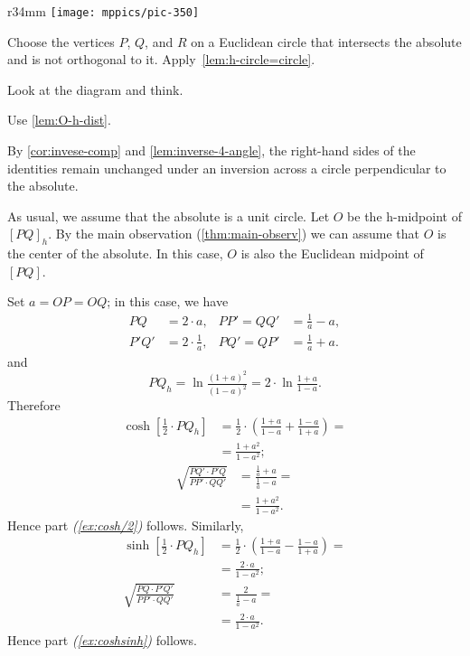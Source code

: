 \begin{wrapfigure}[9]{r}{34mm}
\vskip-0mm
\centering
\texttt{[image: mppics/pic-350]}
\end{wrapfigure}

Choose the vertices $P$, $Q$, and $R$ on a Euclidean circle that intersects the absolute and is not orthogonal to it.
Apply~\ref{lem:h-circle=circle}.

 Look at the diagram and think.

 Use \ref{lem:O-h-dist}.

By \ref{cor:invese-comp} and \ref{lem:inverse-4-angle},
the right-hand sides of the identities 
remain unchanged under an inversion across a circle perpendicular to the absolute.

As usual, we assume that the absolute is a unit circle.
Let $O$ be the h-midpoint of $[PQ]_h$.
By the main observation (\ref{thm:main-observ})
we can assume that $O$ is the center of the absolute.
In this case, $O$ is also the Euclidean midpoint of $[PQ]$.%

Set $a=OP=OQ$; in this case, we have
\begin{align*}
PQ&=2\cdot a,
&
PP'=QQ'&=\tfrac1a-a,
\\
P'Q'&=2\cdot \tfrac1a,
&
PQ'=QP'&=\tfrac1a+a.
\end{align*}
and 
\[PQ_h=\ln \tfrac{(1+a)^2}{(1-a)^2}=2\cdot \ln \tfrac{1+a}{1-a}.\]
Therefore
\begin{align*}
\cosh[\tfrac12\cdot PQ_h]
&=\tfrac12\cdot(\tfrac{1+a}{1-a}+\tfrac{1-a}{1+a})=
\\
&=\tfrac{1+a^2}{1-a^2};
\end{align*} 
\begin{align*}
\sqrt{\frac{PQ'\cdot P'Q}{PP'\cdot QQ'}}
&=\frac{\frac1a+a}{\frac1a-a}=
\\
&=\tfrac{1+a^2}{1-a^2}.
\end{align*} 
Hence part \textit{(\ref{ex:cosh/2})} follows.
Similarly,
\begin{align*}
\sinh[\tfrac12\cdot PQ_h]
&=\tfrac12\cdot\left(\tfrac{1+a}{1-a}-\tfrac{1-a}{1+a}\right)=
\\
&=\tfrac{2\cdot a}{1-a^2};
\\
\sqrt{\frac{PQ\cdot P'Q'}{PP'\cdot QQ'}}
&=\frac{2}{\frac1a-a}=
\\
&=\tfrac{2\cdot a}{1-a^2}.
\end{align*} 
Hence part \textit{(\ref{ex:coshsinh})} follows.

